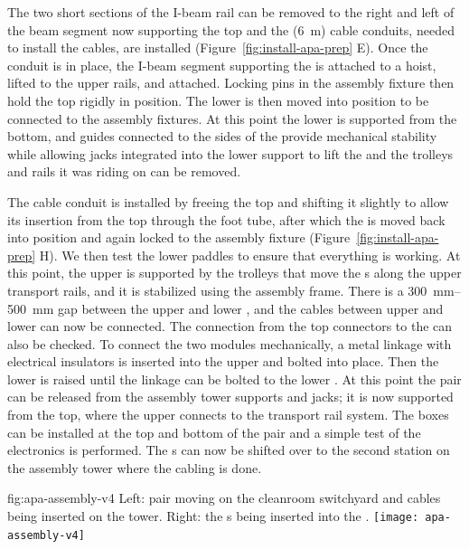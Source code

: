 The two short sections of the I-beam rail can be removed to the right and left of the beam segment now supporting the top  and the (\SI{6}{m}) cable conduits, needed to install the  cables, are installed (Figure~\ref{fig:install-apa-prep} E). 
Once the conduit is in place, the I-beam segment supporting the  is attached to a hoist, lifted to the upper rails, and attached. 
Locking pins in the  assembly fixture then hold the top  rigidly in position. 
The lower  is then moved into position to be connected to the assembly fixtures. 
At this point the  lower  is supported from the bottom, and guides connected to the sides of the  provide mechanical stability while allowing jacks integrated into the lower support to lift the  and the trolleys and rails it was riding on can be removed. 


The cable conduit is installed by freeing the top  and shifting it slightly to allow its insertion from the top through the foot tube, after which  
the  is moved back into position and again locked to the  assembly fixture (Figure~\ref{fig:install-apa-prep} H).
We then test the lower   paddles to ensure that everything is working. 
At this point, the upper  is supported by the trolleys that move the s along the upper transport rails, and it is stabilized using the  assembly frame. There is a \SIrange{300}{500}{mm} gap between the upper and lower , and the %
 cables between upper and lower  can now be connected. 
The connection from the top connectors to the  can also be checked. 
To connect the two  modules mechanically, a metal linkage with electrical insulators is inserted into the upper  and bolted into place. Then the lower  is raised until the linkage can be bolted to the lower .  
At this point the  pair can be released from the assembly tower supports and jacks; it is now supported from the top, where the upper  connects to the transport rail system. The  boxes can be installed at the top and bottom of the  pair and a simple test of the electronics is performed.  
The s can now be shifted over to the second station on the assembly tower where the cabling is done.

\begin{dunefigure}{fig:apa-assembly-v4}
  { Left:  pair  moving on the cleanroom switchyard and cables being inserted on the tower. Right: the s being inserted into the \coldbox.
  }
\texttt{[image: apa-assembly-v4]}

\end{dunefigure}

